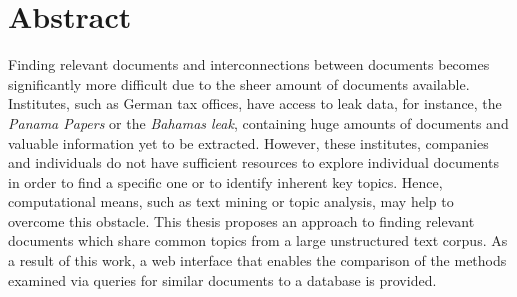 \chapter*{Abstract}

Finding relevant documents and interconnections between documents becomes significantly more difficult due to the sheer amount of documents available.
Institutes, such as German tax offices, have access to leak data, for instance, the \textit{Panama Papers} or the \textit{Bahamas leak}, 
containing huge amounts of documents and valuable information yet to be extracted.
However, these institutes, companies and individuals do not have sufficient resources to explore individual documents 
in order to find a specific one or to identify inherent key topics.
Hence, computational means, such as text mining or topic analysis, may help to overcome this obstacle.
This thesis proposes an approach to finding relevant documents which share common topics from a large unstructured text corpus.
As a result of this work, a web interface that enables the comparison of the methods examined via queries for similar documents to a database is provided. 